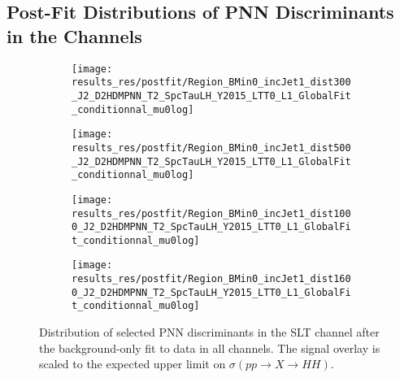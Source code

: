 \subsection{Post-Fit Distributions of PNN Discriminants in the \lephad
  Channels}%
\label{app:pnn_plots_lephad}

\begin{figure}[htbp]
  \centering

  \begin{subfigure}{0.495\textwidth}
    \centering

    \texttt{[image: results\_res/postfit/Region\_BMin0\_incJet1\_dist300\_J2\_D2HDMPNN\_T2\_SpcTauLH\_Y2015\_LTT0\_L1\_GlobalFit\_conditionnal\_mu0log]}
  \end{subfigure}\hfill%
  \begin{subfigure}{0.495\textwidth}
    \centering

    \texttt{[image: results\_res/postfit/Region\_BMin0\_incJet1\_dist500\_J2\_D2HDMPNN\_T2\_SpcTauLH\_Y2015\_LTT0\_L1\_GlobalFit\_conditionnal\_mu0log]}
  \end{subfigure}

  \begin{subfigure}{0.495\textwidth}
    \centering

    \texttt{[image: results\_res/postfit/Region\_BMin0\_incJet1\_dist1000\_J2\_D2HDMPNN\_T2\_SpcTauLH\_Y2015\_LTT0\_L1\_GlobalFit\_conditionnal\_mu0log]}
  \end{subfigure}\hfill%
  \begin{subfigure}{0.495\textwidth}
    \centering

    \texttt{[image: results\_res/postfit/Region\_BMin0\_incJet1\_dist1600\_J2\_D2HDMPNN\_T2\_SpcTauLH\_Y2015\_LTT0\_L1\_GlobalFit\_conditionnal\_mu0log]}
  \end{subfigure}

  \caption[Distribution of selected PNN discriminants in the \lephad SLT channel
  after the background-only fit to data in all channels]{Distribution of
    selected PNN discriminants in the \lephad SLT channel after the
    background-only fit to data in all channels. The signal overlay is scaled to
    the expected upper limit on $\sigma(pp \to X \to HH)$.}
\end{figure}


